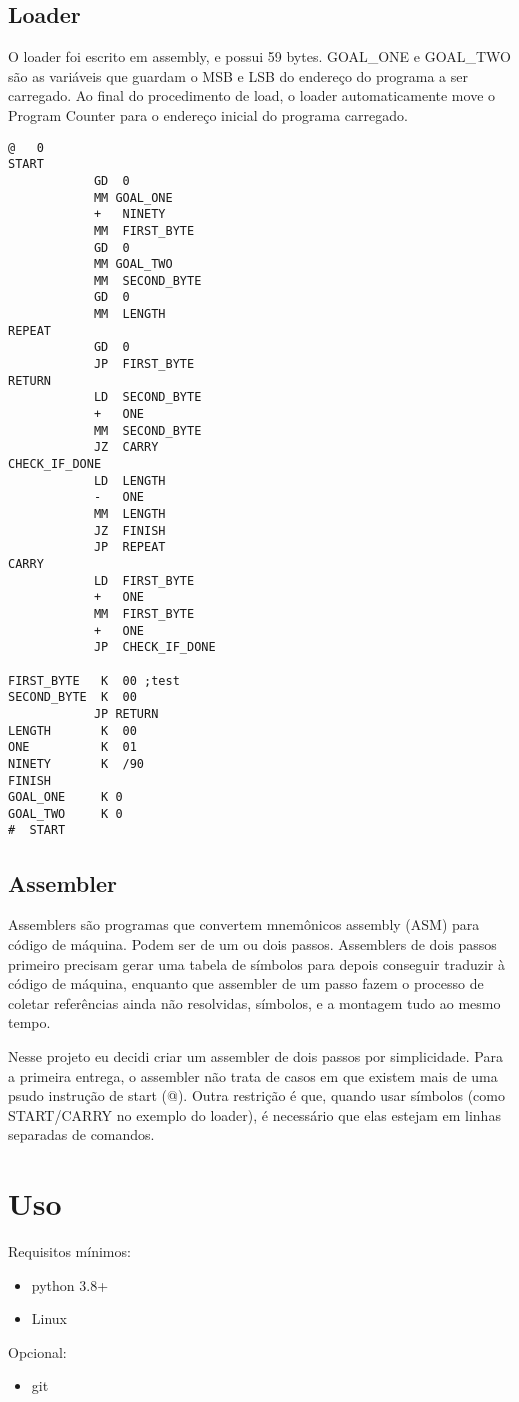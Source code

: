 \documentclass[11pt]{article}
\begin{document}
\subsection{Loader}
\label{sec:orgcff39aa}
O loader foi escrito em assembly, e possui 59 bytes. GOAL\_ONE e GOAL\_TWO são as variáveis que guardam o MSB e LSB do endereço do programa a ser carregado. Ao final do procedimento de load, o loader automaticamente move o Program Counter para o endereço inicial do programa carregado.
\begin{verbatim}
@   0
START
            GD  0
            MM GOAL_ONE
            +   NINETY
            MM  FIRST_BYTE
            GD  0
            MM GOAL_TWO
            MM  SECOND_BYTE
            GD  0
            MM  LENGTH
REPEAT
            GD  0
            JP  FIRST_BYTE
RETURN
            LD  SECOND_BYTE
            +   ONE
            MM  SECOND_BYTE
            JZ  CARRY
CHECK_IF_DONE
            LD  LENGTH
            -   ONE
            MM  LENGTH
            JZ  FINISH
            JP  REPEAT
CARRY
            LD  FIRST_BYTE
            +   ONE
            MM  FIRST_BYTE
            +   ONE
            JP  CHECK_IF_DONE

FIRST_BYTE   K  00 ;test
SECOND_BYTE  K  00
            JP RETURN
LENGTH       K  00
ONE          K  01
NINETY       K  /90
FINISH
GOAL_ONE     K 0
GOAL_TWO     K 0
#  START
\end{verbatim}
\subsection{Assembler}
\label{sec:org93f0a56}
Assemblers são programas que convertem mnemônicos assembly (ASM) para código de
máquina. Podem ser de um ou dois passos. Assemblers de dois passos primeiro
precisam gerar uma tabela de símbolos para depois conseguir traduzir à código de
máquina, enquanto que assembler de um passo fazem o processo de coletar
referências ainda não resolvidas, símbolos, e a montagem tudo ao mesmo tempo.

Nesse projeto eu decidi criar um assembler de dois passos por simplicidade. Para
a primeira entrega, o assembler não trata de casos em que existem mais de uma
psudo instrução de start (@). Outra restrição é que, quando usar símbolos (como
START/CARRY no exemplo do loader), é necessário que elas estejam em linhas
separadas de comandos.

\section{Uso}
\label{sec:org9bdabd7}
Requisitos mínimos:
\begin{itemize}
\item python 3.8+
\item Linux
\end{itemize}
Opcional:
\begin{itemize}
\item git
\end{itemize}
\end{document}
